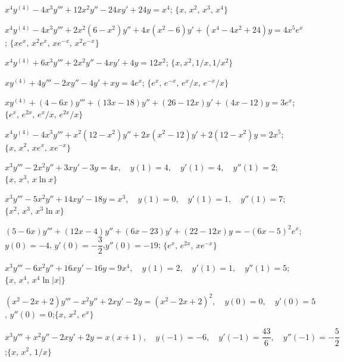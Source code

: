 \begin{exerciselist}
\item\label{exer:9.4.16}$x^4y^{(4)}-4x^3y'''+12x^2y''-24xy'+24y=x^4$; \quad
$\{x,\,x^2,\,x^3,\,x^4\}$

\item\label{exer:9.4.17}$x^4y^{(4)}-4x^3y'''+2x^2(6-x^2)y''+4x(x^2-6)y'+(x^4-4x^2+24)y=4x^5e^x$;
\quad $\{xe^x,\,x^2e^x,\,xe^{-x},\,x^2e^{-x}\}$

\item\label{exer:9.4.18}$x^4y^{(4)}+6x^3y'''+2x^2y''-4xy'+4y=12x^2$;   \quad
$\{x,x^2,1/x,1/x^2\}$

\item\label{exer:9.4.19}$xy^{(4)}+4y'''-2xy''-4y'+xy=4e^x$; \quad
$\{e^x,\,e^{-x},\,e^x/x,\,e^{-x}/x\}$

\item\label{exer:9.4.20}$xy^{(4)}+(4-6x)y'''+(13x-18)y''+(26-12x)y'+(4x-12)y=3e^x$; \quad
 $\{e^x,\,e^{2x},\,e^x/x,\,e^{2x}/x\}$

\item\label{exer:9.4.21}$x^4y^{(4)}-4x^3y'''+x^2(12-x^2)y''+2x(x^2-12)y'+2(12-x^2)y=2x^5$;
 $\{x,\,x^2,\,xe^x,\,xe^{-x}\}$


\item\label{exer:9.4.22}\CGex
$x^3y'''-2x^2y''+3xy'-3y=4x, \quad  y(1)=4,\quad y'(1)=4,
\quad y''(1)=2$; \quad     $\{x,\,x^3,\,x \ln x\}$

\item\label{exer:9.4.23}$x^3y'''-5x^2y''+14xy'-18y=x^3, \quad  y(1)=0,\quad y'(1)=1,\quad
y''(1)=7$;
\quad $\{x^2,\, x^3,\,x^3 \ln x\}$

\item\label{exer:9.4.24}$(5-6x)y'''+(12x-4)y''+(6x-23)y'+(22-12x)y=-(6x-5)^2e^x$; $y(0)=-4$, \quad  $y'(0)=-\dfrac{3}{2}$,\quad $y''(0)=-19$;\quad
 $\{e^x,\,e^{2x},\,xe^{-x} \}$

\item\label{exer:9.4.25}$x^3y'''-6x^2y''+16xy'-16y=9x^4, \quad  y(1)=2,\quad y'(1)=1,\quad y''(1)=5$; $\{x,\,x^4,\,x^4 \ln |x|\}$

\item\label{exer:9.4.26}\CGex
$(x^2-2x+2)y'''-x^2y''+2xy'-2y=(x^2-2x+2)^2, \quad  y(0)=0,\quad y'(0)=5$,
$y''(0)=0$;\quad       $\{x,\,x^2,\,e^x\}$

\item\label{exer:9.4.27}$x^3y'''+x^2y''-2xy'+2y=x(x+1), \quad  y(-1)=-6,\quad y'(-1)=\dfrac{43}{6},\quad y''(-1)=-\dfrac{5}{2}$;\quad $\{x,\,x^2,\,1/x\}$


\end{exerciselist}
